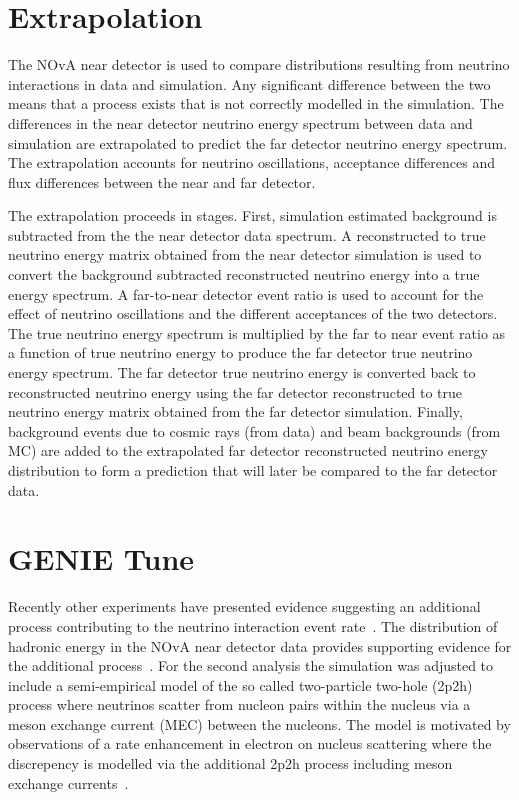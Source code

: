 \section{Extrapolation}\label{sec:extrap}
The NOvA near detector is used to compare distributions resulting from
neutrino interactions in data and simulation. Any significant
difference between the two means that a process exists that is not
correctly modelled in the simulation. 
The differences in the near detector neutrino energy spectrum between
data and simulation are extrapolated to predict the far detector
neutrino energy spectrum. The extrapolation accounts for neutrino
oscillations, acceptance differences and flux differences between the
near and far detector. 

The extrapolation proceeds in stages. 
First, simulation estimated background is subtracted from the the near
detector data spectrum.  
A reconstructed to true neutrino energy matrix obtained from the near
detector simulation is used to convert the background subtracted
reconstructed neutrino energy into a true energy spectrum. 
A far-to-near detector event ratio is used to account for the effect
of neutrino oscillations and the different acceptances of the two
detectors.
The true neutrino energy spectrum is multiplied by the far to near
event ratio as a function of true neutrino energy to produce the far
detector true neutrino energy spectrum.  The far detector
true neutrino energy is converted back to reconstructed
neutrino energy using the far detector reconstructed to true neutrino
energy matrix obtained from the far detector simulation. 
Finally, background events due to cosmic rays (from data) and beam
backgrounds (from MC) are added to the extrapolated far detector
reconstructed neutrino energy distribution to form a prediction that
will later be compared to the far detector data.
\cite{NOvASA}



\section{GENIE Tune}\label{sec:genietune}

Recently other experiments have presented evidence suggesting an
additional process contributing to the neutrino interaction event
rate~\cite{rodrigues2016identification}. 
The distribution of hadronic
energy in the NOvA near detector data provides supporting evidence for
the additional process~\cite{tuftsWeightNote}. 
For the second analysis the simulation was adjusted to include a
semi-empirical model of the so called two-particle two-hole (2p2h)
process where 
neutrinos scatter from nucleon pairs within the nucleus via a meson
exchange current (MEC) between the nucleons.
The model is motivated by observations of a rate enhancement in
electron on nucleus scattering where the discrepency is modelled via
the additional 2p2h process including meson exchange
currents~\cite{benhar2008inclusive}. 

